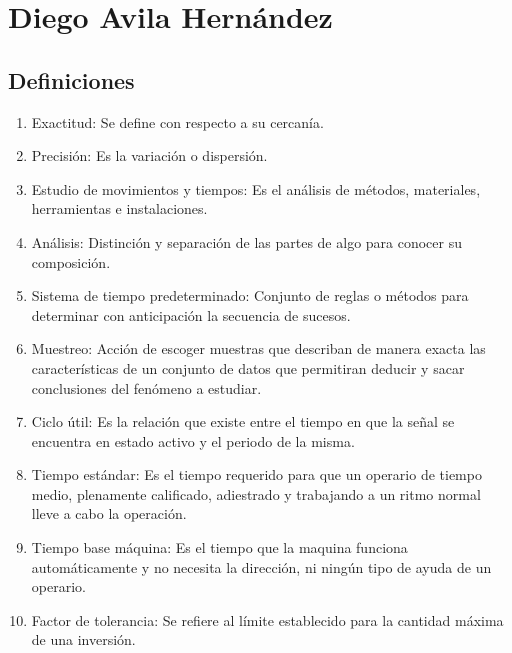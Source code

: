\section{Diego Avila Hernández}
\subsection{Definiciones}

\begin{enumerate}
    \item Exactitud: Se define con respecto a su cercanía.
    \item Precisión: Es la variación o dispersión.
    \item Estudio de movimientos y tiempos: Es el análisis de métodos, materiales, herramientas e instalaciones.
    \item Análisis: Distinción y separación de las partes de algo para conocer su composición.
    \item Sistema de tiempo predeterminado: Conjunto de reglas o métodos para determinar con anticipación la secuencia de sucesos.
    \item Muestreo: Acción de escoger muestras que describan de manera exacta las características de un conjunto de datos que permitiran deducir y sacar conclusiones del fenómeno a estudiar.
    \item Ciclo útil: Es la relación que existe entre el tiempo en que la señal se encuentra en estado activo y el periodo de la misma.
    \item Tiempo estándar: Es el tiempo requerido para que un operario de tiempo medio, plenamente calificado, adiestrado y trabajando a un ritmo normal lleve a cabo la operación.
    \item Tiempo base máquina: Es el tiempo que la maquina funciona automáticamente y no necesita la dirección, ni ningún tipo de ayuda de un operario.
    \item Factor de tolerancia: Se refiere al límite establecido para la cantidad máxima de una inversión.
    
    
\end{enumerate}